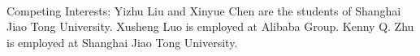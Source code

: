 \documentclass{nle}
\theoremstyle{definition}
\begin{document}
\maketitle






~\\
\noindent
Competing Interests: Yizhu Liu and  Xinyue Chen are the students of Shanghai Jiao Tong University. Xusheng Luo is employed at Alibaba Group. Kenny Q. Zhu is employed at Shanghai Jiao Tong University.




\label{lastpage}
\end{document}
